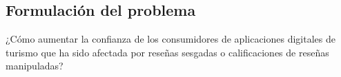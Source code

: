 \subsection{Formulación del problema}
¿Cómo aumentar la confianza de los consumidores de aplicaciones digitales de turismo que ha sido afectada por reseñas sesgadas o calificaciones de reseñas manipuladas?